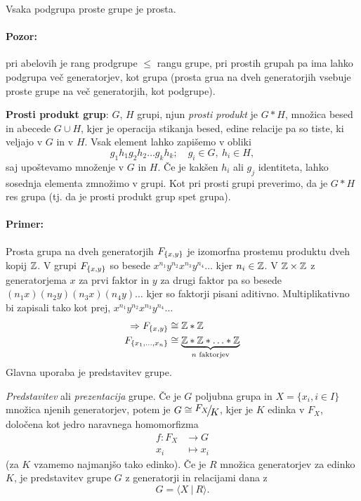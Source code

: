 \begin{trditev}
	Vsaka podgrupa proste grupe je prosta.
	
	\paragraph{Pozor:} pri abelovih je rang prodgrupe $\leq$ rangu grupe, pri prostih grupah pa ima lahko podgrupa
	ve\v c generatorjev, kot grupa (prosta grua na dveh generatorjih vsebuje proste grupe na ve\v c generatorjih, kot
	podgrupe).
\end{trditev} 

\begin{defin}
	{\bf Prosti produkt grup}: $G$, $H$ grupi, njun {\em prosti produkt} je $G * H$, mno\v zica besed in abecede $G \cup H$,
	kjer je operacija stikanja besed, edine relacije pa so tiste, ki veljajo v $G$ in v $H$. Vsak element lahko zapi\v semo
	v obliki
	\[
		g_1 h_1 g_2 h_2 \ldots g_k h_k; \quad g_i \in G,\ h_i \in H,
	\]
	saj upo\v stevamo mno\v zenje v $G$ in $H$. \v Ce je kak\v sen $h_i$ ali $g_j$ identiteta, lahko sosednja elementa
	zmno\v zimo v grupi. Kot pri prosti grupi preverimo, da je $G * H$ res grupa (tj. da je prosti produkt grup spet
	grupa).
\end{defin}

\paragraph{Primer:} Prosta grupa na dveh generatorjih $F_{ \{  x, y  \} }$ je izomorfna prostemu produktu dveh kopij $\mathbb{Z}$. V
grupi $F_{ \{  x, y  \} }$ so besede $x^{n_1}y^{n_2}x^{n_3}y^{n_4}\ldots$ kjer $n_i \in \mathbb{Z}$. V $\mathbb{Z} \times \mathbb{Z}$ z generatorjema
$x$ za prvi faktor in $y$ za drugi faktor pa so besede $(n_1x)(n_2y)(n_3x)(n_4y)\ldots$ kjer so faktorji pisani aditivno.
Multiplikativno bi zapisali tako kot prej, $x^{n_1}y^{n_2}x^{n_3}y^{n_4}\ldots$
\begin{align*}
	\Rightarrow F_{ \{  x,y  \} } &\cong \mathbb{Z} * \mathbb{Z} \\
	F_{ \{  x_1, \ldots , x_n \} } &\cong \underbrace{\mathbb{Z} * \mathbb{Z} * \ldots * \mathbb{Z}}_\text{$n$ faktorjev}
\end{align*}
\ni Glavna uporaba je predstavitev grupe.

\begin{defin}
	\emph{Predstavitev} ali {\em prezentacija} grupe. \v Ce je $G$ poljubna grupa in $X = \{x_i, i \in I\}$ mno\v zica
	njenih generatorjev, potem je $G \cong \quot{F_X}{K}$, kjer je $K$ edinka v $F_X$, dolo\v cena kot jedro naravnega
	homomorfizma
	\begin{align*}
		f : F_X & \to G \\
		x_i & \mapsto x_i
	\end{align*}
	(za $K$ vzamemo najmanj\v so tako edinko). \v Ce je $R$ mno\v zica generatorjev za edinko $K$, je predstavitev grupe $G$
	z generatorji in relacijami dana z
	\begin{equation}
		G = \langle X\ |\ R \rangle.
	\end{equation}
\end{defin}

